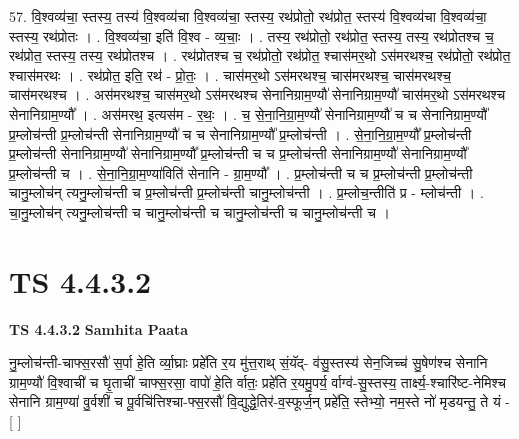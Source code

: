 \documentclass[17pt]{extarticle}
\begin{document}
57. वि॒श्वव्य॑चा॒ स्तस्य॒ तस्य॑ वि॒श्वव्य॑चा वि॒श्वव्य॑चा॒ स्तस्य॒ रथ॑प्रोतो॒ रथ॑प्रोत॒ स्तस्य॑ वि॒श्वव्य॑चा वि॒श्वव्य॑चा॒ स्तस्य॒ रथ॑प्रोतः । . वि॒श्वव्य॑चा॒ इति॑ वि॒श्व - व्य॒चाः॒ । . तस्य॒ रथ॑प्रोतो॒ रथ॑प्रोत॒ स्तस्य॒ तस्य॒ रथ॑प्रोतश्च च॒ रथ॑प्रोत॒ स्तस्य॒ तस्य॒ रथ॑प्रोतश्च । . रथ॑प्रोतश्च च॒ रथ॑प्रोतो॒ रथ॑प्रोत॒ श्चास॑मर॒थो ऽस॑मरथश्च॒ रथ॑प्रोतो॒ रथ॑प्रोत॒ श्चास॑मरथः । . रथ॑प्रोत॒ इति॒ रथ॑ - प्रो॒तः॒ । . चास॑मर॒थो ऽस॑मरथश्च॒ चास॑मरथश्च॒ चास॑मरथश्च॒ चास॑मरथश्च । . अस॑मरथश्च॒ चास॑मर॒थो ऽस॑मरथश्च सेनानिग्राम॒ण्यौ॑ सेनानिग्राम॒ण्यौ॑ चास॑मर॒थो ऽस॑मरथश्च सेनानिग्राम॒ण्यौ᳚ । . अस॑मरथ॒ इत्यस॑म - र॒थः॒ । . च॒ से॒ना॒नि॒ग्रा॒म॒ण्यौ॑ सेनानिग्राम॒ण्यौ॑ च च सेनानिग्राम॒ण्यौ᳚ प्र॒म्लोच॑न्ती प्र॒म्लोच॑न्ती सेनानिग्राम॒ण्यौ॑ च च सेनानिग्राम॒ण्यौ᳚ प्र॒म्लोच॑न्ती । . से॒ना॒नि॒ग्रा॒म॒ण्यौ᳚ प्र॒म्लोच॑न्ती प्र॒म्लोच॑न्ती सेनानिग्राम॒ण्यौ॑ सेनानिग्राम॒ण्यौ᳚ प्र॒म्लोच॑न्ती च च प्र॒म्लोच॑न्ती सेनानिग्राम॒ण्यौ॑ सेनानिग्राम॒ण्यौ᳚ प्र॒म्लोच॑न्ती च । . से॒ना॒नि॒ग्रा॒म॒ण्या॑विति॑ सेनानि - ग्रा॒म॒ण्यौ᳚ । . प्र॒म्लोच॑न्ती च च प्र॒म्लोच॑न्ती प्र॒म्लोच॑न्ती चानु॒म्लोच॑न् त्यनु॒म्लोच॑न्ती च प्र॒म्लोच॑न्ती प्र॒म्लोच॑न्ती चानु॒म्लोच॑न्ती । . प्र॒म्लोच॒न्तीति॑ प्र - म्लोच॑न्ती । . चा॒नु॒म्लोच॑न् त्यनु॒म्लोच॑न्ती च चानु॒म्लोच॑न्ती च चानु॒म्लोच॑न्ती च चानु॒म्लोच॑न्ती च । \newline
\pagebreak
{}

\section{ TS 4.4.3.2 }

\textbf{TS 4.4.3.2 } \newline
\textbf{Samhita Paata} \newline

नु॒म्लोच॑न्ती-चाफ्स॒रसौ॑ स॒र्पा हे॒ति र्व्या॒घ्राः प्रहे॑ति र॒य मु॑त्त॒राथ् सं॒यॅद्- व॑सु॒स्तस्य॑ सेन॒जिच्च॑ सु॒षेण॑श्च सेनानि ग्राम॒ण्यौ॑ वि॒श्वाची॑ च घृ॒ताची॑ चाफ्स॒रसा॒ वापो॑ हे॒ति र्वातः॒ प्रहे॑ति र॒यमु॒पर्य॒ र्वाग्व॑-सु॒स्तस्य॒ तार्क्ष्य॒-श्चारि॑ष्ट-नेमिश्च सेनानि ग्राम॒ण्या॑ वु॒र्वशी॑ च पू॒र्वचि॑त्तिश्चा-फ्स॒रसौ॑ वि॒द्युद्धे॒तिर॑-व॒स्फूर्ज॒न् प्रहे॑ति॒ स्तेभ्यो॒ नम॒स्ते नो॑ मृडयन्तु॒ ते यं - [  ] \newline
\end{document}
